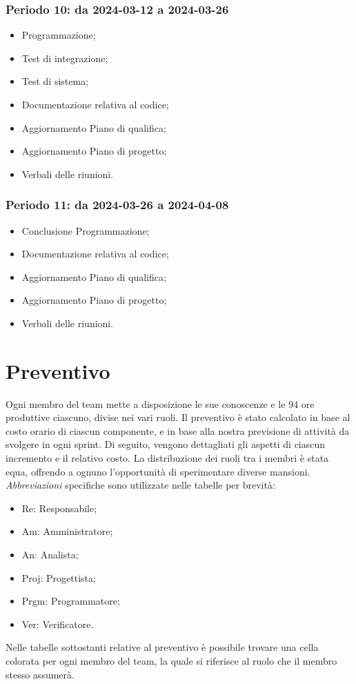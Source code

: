 \documentclass[10pt, a4paper]{article}
\begin{document}
\subsubsection{Periodo 10: da 2024-03-12 a 2024-03-26}
%
\begin{itemize}
    \item Programmazione;
    \item Test di integrazione;
    \item Test di sistema;
    \item Documentazione relativa al codice;
    \item Aggiornamento Piano di qualifica;
    \item Aggiornamento Piano di progetto;
    \item Verbali delle riunioni.
\end{itemize}
\subsubsection{Periodo 11: da 2024-03-26 a 2024-04-08}
%
\begin{itemize}
    \item Conclusione Programmazione;
    \item Documentazione relativa al codice;
    \item Aggiornamento Piano di qualifica;
    \item Aggiornamento Piano di progetto;
    \item Verbali delle riunioni.
\end{itemize}


\newpage
\section{Preventivo}
Ogni membro del team mette a disposizione le sue conoscenze e le 94 ore produttive ciascuno, divise nei vari ruoli. Il preventivo è stato calcolato in base al costo orario di ciascun componente, e in base alla nostra previsione di attività da svolgere in ogni sprint. Di seguito, vengono dettagliati gli aspetti di ciascun incremento e il relativo costo. La distribuzione dei ruoli tra i membri è stata equa, offrendo a ognuno l'opportunità di sperimentare diverse mansioni. \textit{Abbreviazioni\pg} specifiche sono utilizzate nelle tabelle per brevità:
\begin{itemize}
    \item Re: Responsabile;
    \item Am: Amministratore;
    \item An: Analista;
    \item Proj: Progettista;
    \item Prgm: Programmatore;
    \item Ver: Verificatore.
\end{itemize}
Nelle tabelle sottostanti relative al preventivo è possibile trovare una cella colorata per ogni membro del team, la quale si riferisce al ruolo che il membro stesso assumerà.
\end{document}
